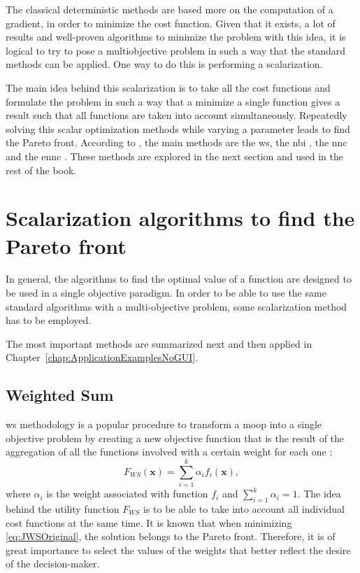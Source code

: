 The classical deterministic methods are based more on the computation of a gradient, in order to minimize the cost function. Given that it exists, a lot of results and well-proven algorithms to minimize the problem with this idea, it is logical to try to pose a multiobjective problem in such a way that the standard methods can be applied. One way to do this is performing a scalarization.

The main idea behind this scalarization is to take all the cost functions and formulate the problem in such a way that a minimize a single function gives a result such that all functions are taken into account simultaneously. Repeatedly solving this scalar optimization methods while varying a parameter leads to find the Pareto front. According to \citet{Marler2004}, the main methods are the \gls{ws}, the \gls{nbi} \citep{Das1998}, the \gls{nnc} \citep{Messac2003} and the \gls{ennc} \citep{Sanchis2008}. These methods are explored in the next section and used in the rest of the book.
\section{Scalarization algorithms to find the Pareto front}
\label{sec:design-methodologies}

In general, the algorithms to find the optimal value of a function are designed to be used in a single objective paradigm. In order to be able to use the same standard algorithms with a multi-objective problem, some scalarization method has to be employed.

The most important methods are summarized next and then applied in Chapter~\ref{chap:ApplicationExamplesNoGUI}.

\subsection{Weighted Sum}
\label{sec:WS}
\gls{ws} methodology is a popular procedure to transform a \gls{moop} into a single objective problem by creating a new objective function that is the result of the aggregation of all the functions involved with a certain weight for each one \citep{Marler2004}:
%
\begin{equation}
F_{WS}(\mathbf{x}) = \sum_{i=1}^{k}\alpha_{i} {f}_{i}(\mathbf{x}),
\label{eq:JWSOriginal}
\end{equation}
%
where $\alpha_i$ is the weight associated with function $f_i$ and $\sum_{i=1}^{k}\alpha_{i} = 1$. The idea behind the utility function $F_{WS}$ is to be able to take into account all individual cost functions at the same time. It is known that when minimizing \eqref{eq:JWSOriginal}, the solution belongs to the Pareto front. Therefore, it is of great importance to select the values of the weights that better reflect the desire of the decision-maker.

